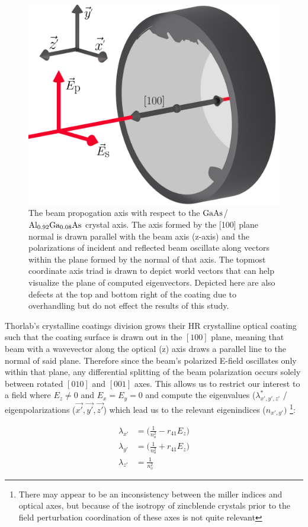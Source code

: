 \begin{figure}[!ht]
    \centering
	\includegraphics[width=.6\textwidth]{figs/ALGAAS/laser_mirror_algaas_coat_defect_coords.pdf}
	\caption{The beam propogation axis with respect to the $\mathrm{GaAs}$/$\mathrm{Al_{0.92}Ga_{0.08}As}$ crystal axis. The axis formed by the [100] plane normal is drawn parallel with the beam axis (z-axis) and the polarizations of incident and reflected beam oscillate along vectors within the plane formed by the normal of that axis. The topmost coordinate axis triad is drawn to depict world vectors that can help visualize the plane of computed eigenvectors. Depicted here are also defects at the top and bottom right of the coating due to overhandling but do not effect the results of this study.}
\label{fig:algaas_coord_defect}
\end{figure}



\noindent Thorlab's crystalline coatings division grows their HR crystalline optical coating such that the coating surface is drawn out in the $[100]$ plane, meaning that beam with a wavevector along the optical (z) axis draws a parallel line to the normal of said plane. Therefore since the beam's polarized E-field oscillates only within that plane, any differential splitting of the beam polarization occurs solely between rotated $[010]$ and $[001]$ axes. This allows us to restrict our interest to a field where $E_{z} \neq 0$ and $E_x = E_y =0$ and compute the eigenvalues ($\lambda^{*}_{x',y',z'}$ / eigenpolarizations ($\vec{x'}, \vec{y'}, \vec{z'}$) which lead us to the relevant eigenindices ($n_{x',y'})$ \footnote{There may appear to be an inconsistency between the miller indices and optical axes, but because of the isotropy of zincblende crystals prior to the field perturbation coordination of these axes is not quite relevant}:

\begin{equation}
    \begin{aligned}
    	\lambda_{x'} & = \big( \frac{1}{n_o ^2} - r_{41} E_z \big) \\
	\lambda_{y'} & = \big( \frac{1}{n_o ^2} + r_{41} E_z \big) \\
	\lambda_{z'} &  = \frac{1}{n_o ^2}
    \end{aligned}
\end{equation}


